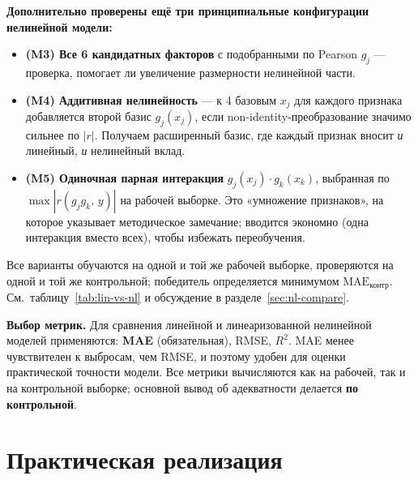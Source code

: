 \documentclass[a4paper, 14pt]{extarticle}
\begin{document}
\textbf{Дополнительно проверены ещё три принципиальные конфигурации нелинейной модели:}
\begin{itemize}
  \item \textbf{(M3) Все 6 кандидатных факторов} с подобранными по Pearson $g_j$ --- проверка, помогает ли увеличение размерности нелинейной части.
  \item \textbf{(M4) Аддитивная нелинейность} --- к 4 базовым $x_j$ для каждого признака добавляется второй базис $g_j(x_j)$, если non-identity-преобразование значимо сильнее по $|r|$. Получаем расширенный базис, где каждый признак вносит \emph{и} линейный, \emph{и} нелинейный вклад.
  \item \textbf{(M5) Одиночная парная интеракция} $g_j(x_j)\cdot g_k(x_k)$, выбранная по
        $\max |r(g_j g_k,\,y)|$ на рабочей выборке. Это «умножение признаков», на которое указывает методическое замечание; вводится экономно (одна интеракция вместо всех), чтобы избежать переобучения.
\end{itemize}
Все варианты обучаются на одной и той же рабочей выборке, проверяются на одной и той же контрольной;
победитель определяется минимумом $\mathrm{MAE}_{\text{контр}}$. См.~таблицу~\ref{tab:lin-vs-nl} и обсуждение в разделе~\ref{sec:nl-compare}.

\textbf{Выбор метрик.} Для сравнения линейной и линеаризованной нелинейной моделей применяются:
\textbf{MAE} (обязательная), RMSE, $R^{2}$. MAE менее чувствителен к выбросам, чем RMSE, и поэтому удобен для
оценки практической точности модели. Все метрики вычисляются как на рабочей, так и на контрольной выборке;
основной вывод об адекватности делается \textbf{по контрольной}.

\section{Практическая реализация}
\end{document}
